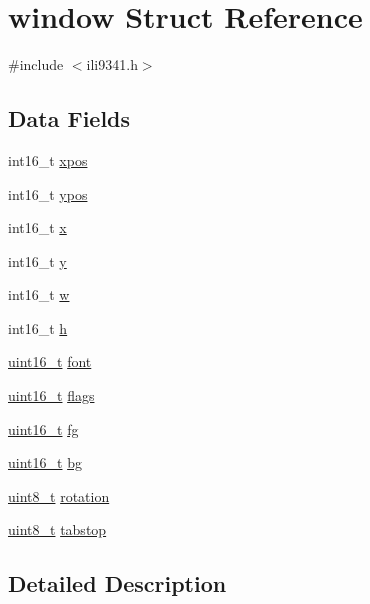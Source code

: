 \hypertarget{structwindow}{}\section{window Struct Reference}
\label{structwindow}


{\ttfamily \#include $<$ili9341.\+h$>$}

\subsection*{Data Fields}
\begin{DoxyCompactItemize}
\item 
int16\+\_\+t \hyperlink{structwindow_a890a7dba31e7328500f4e5e41e51aab7}{xpos}
\item 
int16\+\_\+t \hyperlink{structwindow_a64bdec4f0ee274a96d696b16de783746}{ypos}
\item 
int16\+\_\+t \hyperlink{structwindow_a879b99940dfc34772f0257f54c67b817}{x}
\item 
int16\+\_\+t \hyperlink{structwindow_a95c7023fc42e79ab42c291b90a490776}{y}
\item 
int16\+\_\+t \hyperlink{structwindow_ad89fdeb11ce94e2e7501f7290372d6ae}{w}
\item 
int16\+\_\+t \hyperlink{structwindow_a822391abd5d09e6ce7152f68cff3ef2b}{h}
\item 
\hyperlink{send_8c_a273cf69d639a59973b6019625df33e30}{uint16\+\_\+t} \hyperlink{structwindow_acee24e56db43557a46cbb5ca3fe35021}{font}
\item 
\hyperlink{send_8c_a273cf69d639a59973b6019625df33e30}{uint16\+\_\+t} \hyperlink{structwindow_ad58fae853f87093ef4f0139df0a3f33d}{flags}
\item 
\hyperlink{send_8c_a273cf69d639a59973b6019625df33e30}{uint16\+\_\+t} \hyperlink{structwindow_ac8739cdb3c50efcc1deaa5ab955a5e62}{fg}
\item 
\hyperlink{send_8c_a273cf69d639a59973b6019625df33e30}{uint16\+\_\+t} \hyperlink{structwindow_affcf5d29153103c2537542f5a4f8ba87}{bg}
\item 
\hyperlink{send_8c_aba7bc1797add20fe3efdf37ced1182c5}{uint8\+\_\+t} \hyperlink{structwindow_afbd48ebcb41e68d0f458dac593578aa8}{rotation}
\item 
\hyperlink{send_8c_aba7bc1797add20fe3efdf37ced1182c5}{uint8\+\_\+t} \hyperlink{structwindow_a88d2836d45dd428d8fadfd703f0f965f}{tabstop}
\end{DoxyCompactItemize}


\subsection{Detailed Description}


